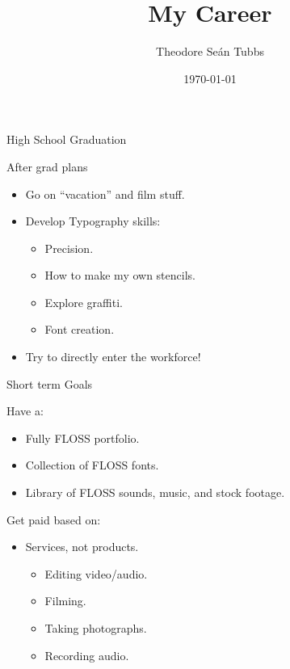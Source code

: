 \documentclass[xcolor=svgnames,handout]{beamer}
\title
  [My Career\hspace{2em}]
  {My Career}
\author
  [Theodore Se\'{a}n Tubbs]
  {Theodore Se\'{a}n Tubbs}
\date
  {\today}
\institute
  {DCMO BOCES}
\begin{document}
\maketitle

\begin{frame}{High School Graduation}

After grad plans\pause

\begin{itemize}
	\item{Go on ``vacation'' and film stuff.}
	\item{Develop Typography skills:}
	\begin{itemize}
		\item{Precision.}
		\item{How to make my own stencils.}
		\item{Explore graffiti.}
		\item{Font creation}.
	\end{itemize}
	\item{Try to directly enter the workforce!}
\end{itemize}

\end{frame}

\begin{frame}{Short term Goals}

Have a:\pause
	\begin{itemize}
		\item{Fully FLOSS portfolio.}
		\item{Collection of FLOSS fonts.}
		\item{Library of FLOSS sounds, music, and stock footage.}
	\end{itemize}

Get paid based on:\pause
	\begin{itemize}
		\item{Services, not products.}
			\begin{itemize}
				\item{Editing video/audio.}
				\item{Filming.}
				\item{Taking photographs.}
				\item{Recording audio.}
			\end{itemize}
	\end{itemize}
\end{frame}
\end{document}
